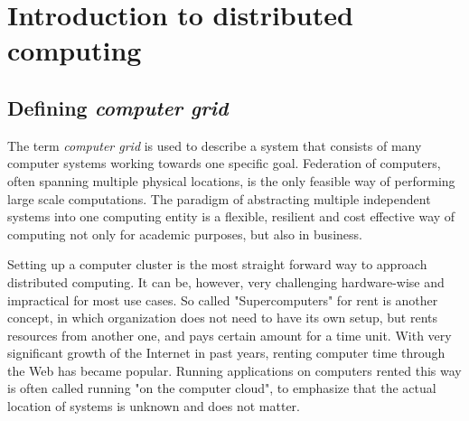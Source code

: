\chapter{Introduction to distributed computing}

\section{Defining \emph{computer grid}}

\begin{comment}

roadmap:
https://workflowy.com/shared/a2a23b89-e51f-4f48-4fb9-dd4d9194998f/

wprowadzenie

paradigm shift: kiedyś komputery jako wielkie systemy bez interaktywnego dostępu, wykonywanie zadan, długi czas oczekiwania na zadanie
później rewolucja "personal computers", (xerox, apple, ibm, ibm compatible) - interaktywny dostęp, każdy mógł wykonywać swoje obliczenia
teraz obserwujemy kolejną rewolucję (? czy nie nadzbyt dalekoidące wnisoki?) - computer grids, cloud computing, volunteer computing, microsoft xbox one cloud computing for games

co to jest grid, co to jest cloud, co to jest volunteer computing

przykłady już tutaj czy dalej?

"Na jej podstawie została stworzona siec Arpanet, z której wyewoluował ´
Internet, globalna siec komputerowa. Jej powstanie stworzyło nowe mo ´ zliwo ˙ sci ´
przesyłania danych do komputerów, do których uzytkownik nie ma bezpo ˙ srednie- ´
go dost˛epu. Wczesniej przetwarzanie danych było zamkni˛ete w obr˛ebie jedn ´ ego
osrodka."

\end{comment}

The term \emph{computer grid} is used to describe a system that consists of many computer systems working towards one specific goal. Federation of computers, often spanning multiple physical locations, is the only feasible way of performing large scale computations. The paradigm of abstracting multiple independent systems into one computing entity is a flexible, resilient and cost effective way of computing not only for academic purposes, but also in business.

Setting up a computer cluster is the most straight forward way to approach distributed computing. It can be, however, very challenging hardware-wise and impractical for most use cases. So called "Supercomputers" for rent is another concept, in which organization does not need to have its own setup, but rents resources from another one, and pays certain amount for a time unit. With very significant growth of the Internet in past years, renting computer time through the Web has became popular. Running applications on computers rented this way is often called running "on the computer cloud", to emphasize that the actual location of systems is unknown and does not matter.

